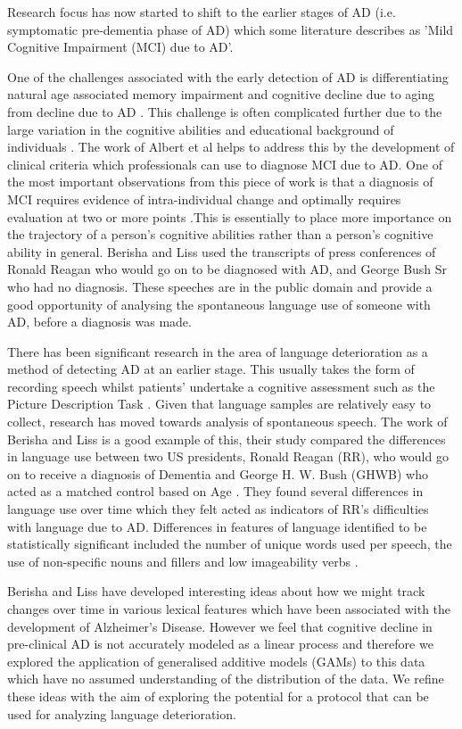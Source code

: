 \documentclass[12pt]{article}
\begin{document}
Research focus has now started to shift to the earlier stages of AD (i.e. symptomatic pre-dementia phase of AD) which some literature describes as 'Mild Cognitive Impairment (MCI) due to AD'.
\par
One of the challenges associated with the early detection of AD is differentiating natural age associated memory impairment and cognitive decline due to aging from decline due to AD \cite{Lo2017}. This challenge is often complicated further due to the large variation in the cognitive abilities and educational background of individuals \cite{Harada2013}. The work of Albert et al helps to address this by the development of clinical criteria which professionals can use to diagnose MCI due to AD. One of the most important observations from this piece of work is that a diagnosis of MCI requires evidence of intra-individual change and optimally requires evaluation at two or more points \cite{Albert2011}.This is essentially to place more importance on the trajectory of a person's cognitive abilities rather than a person's cognitive ability in general. Berisha and Liss used the transcripts of press conferences of Ronald Reagan who would go on to be diagnosed with AD, and George Bush Sr who had no diagnosis. These speeches are in the public domain and provide a good opportunity of analysing the spontaneous language use of someone with AD, before a diagnosis was made. 
\par 
There has been significant research in the area of language deterioration as a method of detecting AD at an earlier stage. This usually takes the form of recording speech whilst patients' undertake a cognitive assessment such as the Picture Description Task \cite{Fraser2015}. Given that language samples are relatively easy to collect, research has moved towards analysis of spontaneous speech. The work of Berisha and Liss is a good example of this, their study compared the differences in language use between two US presidents, Ronald Reagan (RR), who would go on to receive a diagnosis of Dementia and George H. W. Bush (GHWB) who acted as a matched control based on Age \cite{Berisha2015}. They found several differences in language use over time which they felt acted as indicators of RR's difficulties with language due to AD. Differences in features of language identified to be statistically significant included the number of unique words used per speech, the use of non-specific nouns and fillers and low imageability verbs \cite{Berisha2015}. 
\par
Berisha and Liss have developed interesting ideas about how we might track changes over time in various lexical features which have been associated with the development of Alzheimer's Disease. However we feel that cognitive decline in pre-clinical AD is not accurately modeled as a linear process and therefore we explored the application of generalised additive models (GAMs) to this data which have no assumed understanding of the distribution of the data. We refine these ideas with the aim of exploring the potential for a protocol that can be used for analyzing language deterioration. 
\end{document}

